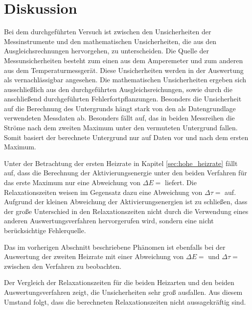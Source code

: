 \section{Diskussion}
\label{sec:Diskussion}

Bei dem durchgeführten Versuch ist zwischen den Unsicherheiten der Messinstrumente und den mathematischen Unsicherheiten, die aus den Ausgleichsrechnungen hervorgehen, zu unterscheiden. Die Quelle der Messunsicherheiten besteht zum einen aus dem Amperemeter und zum anderen aus dem Temperaturmessgerät. Diese Unsicherheiten werden in der Auswertung als vernachlässigbar angesehen. Die mathematischen Unsicherheiten ergeben sich ausschließlich aus den durchgeführten Ausgleichsreichungen, sowie durch die anschließend durchgeführten Fehlerfortpflanzungen. Besonders die Unsicherheit auf die Berechnung des Untergrunds hängt stark von den als Datengrundlage verwendeten Messdaten ab. Besonders fällt auf, das in beiden Messreihen die Ströme nach dem zweiten Maximum unter den vermuteten Untergrund fallen. Somit basiert der berechnete Untergrund nur auf Daten vor und nach dem ersten Maximum. 

Unter der Betrachtung der ersten Heizrate in Kapitel \ref{sec:hohe_heizrate} fällt auf, dass die Berechnung der Aktivierungsenergie unter den beiden Verfahren für das erste Maximum nur eine Abweichung von $\Delta E = $ liefert. Die Relaxationszeiten weisen im Gegensatz dazu eine Abweichung von $\Delta\tau = $ auf. Aufgrund der kleinen Abweichung der Aktivierungsenergien ist zu schließen, dass der große Unterschied in den Relaxationszeiten nicht durch die Verwendung eines anderen Auswertungsverfahren hervorgerufen wird, sondern eine nicht berücksichtige Fehlerquelle.

Das im vorherigen Abschnitt beschriebene Phänomen ist ebenfalls bei der Auswertung der zweiten Heizrate mit einer Abweichung von $\Delta E = $ und $\Delta\tau = $ zwischen den Verfahren zu beobachten.

Der Vergleich der Relaxationszeiten für die beiden Heizarten und den beiden Auswertungsverfahren zeigt, die Unsicherheiten sehr groß ausfallen. Aus diesem Umstand folgt, dass die berechneten Relaxationszeiten nicht aussagekräftig sind. 